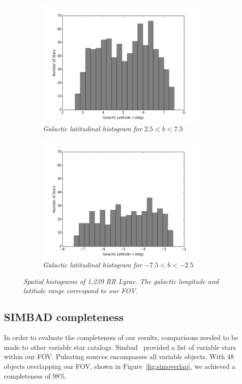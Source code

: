 \documentclass[aps,prb,twocolumn,superscriptaddress]{revtex4-1}
\begin{document}
\begin{figure}
	\begin{subfigure}{.5\textwidth}
	  \centering
	  \includegraphics[width=3.35in]{figures/PlotsSpace15/bphist_limit15.png}
		\caption{\it \small{Galactic latitudinal histogram for $2.5 < b < 7.5$}}
		\label{fig:bphist}
	\end{subfigure}%
	\begin{subfigure}{.5\textwidth}
	  \centering
			\includegraphics[width=3.35in]{figures/PlotsSpace15/bnhist_limit15.png}
		\caption{\it \small{Galactic latitudinal histogram for $-7.5 < b < -2.5$}}
		\label{fig:bnhist}
	\end{subfigure}%
	\caption{\it \small{Spatial histograms of 1,239 RR Lyrae. The galactic longitude and latitude range correspond to our FOV.}}
	\label{fig:blhist}
\end{figure}




\subsection{SIMBAD completeness}

In order to evaluate the completeness of our results, comparisons needed to be made to other variable star catalogs.  Simbad~\cite{simbad} provided a list of variable stars within our FOV.  Pulsating sources encompasses all variable objects.  With 48 objects overlapping our FOV, shown in Figure~\ref{fig:simoverlap}, we achieved a completeness of $98\%$.
\end{document}
